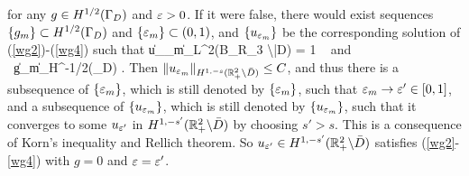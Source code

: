 \documentclass[12pt]{iopart}
\begin{document}
\ee
for any $g \in H^{1/2}(\Gamma_D)$ and $\varepsilon >0$. If it were false, there would exist sequences $\{g_m\} \subset H^{1/2}(\Gamma_D)$ and $\{\varepsilon_m\} \subset (0,1)$, and $\{u_{\varepsilon_m}\}$ be the corresponding solution of (\ref{wg2})-(\ref{wg4}) such that
\be {\label{contradict}}
\|u_{\eps_m}\|_{L^2(B_{R_3} \backslash \bar D)} = 1 \ {\rm{ and }} \ \|g_m\|_{H^{-1/2}(\Ga_D)} \leq {}.
\ee
Then $\|u_{\varepsilon_m}\|_{H^{1,-s} ( {\mathbb{R}}^2_+ \backslash \bar{D})}\le C $, and thus there is a subsequence of $\{\varepsilon_m\}$, which is
still denoted by $\{\varepsilon_m\}$, such that $\varepsilon_m \to \varepsilon' \in [0,1]$, and a subsequence of $\{u_{\varepsilon_m}\}$,
which is still denoted by $\{u_{\varepsilon_m}\}$, such that it converges to some $u_{\varepsilon'}$ in ${H^{1,-s'} ( {\mathbb{R}}^2_+ \backslash \bar{D})}$ by choosing $s'>s$. This is a consequence of Korn's inequality and Rellich theorem. So $u_{\varepsilon'} \in H^{1,-s'}({\mathbb{R}}^2_+ \backslash \bar D)$ satisfies (\ref{wg2}-\ref{wg4}) with $g=0$ and $\varepsilon=\varepsilon'$.
\end{document}
